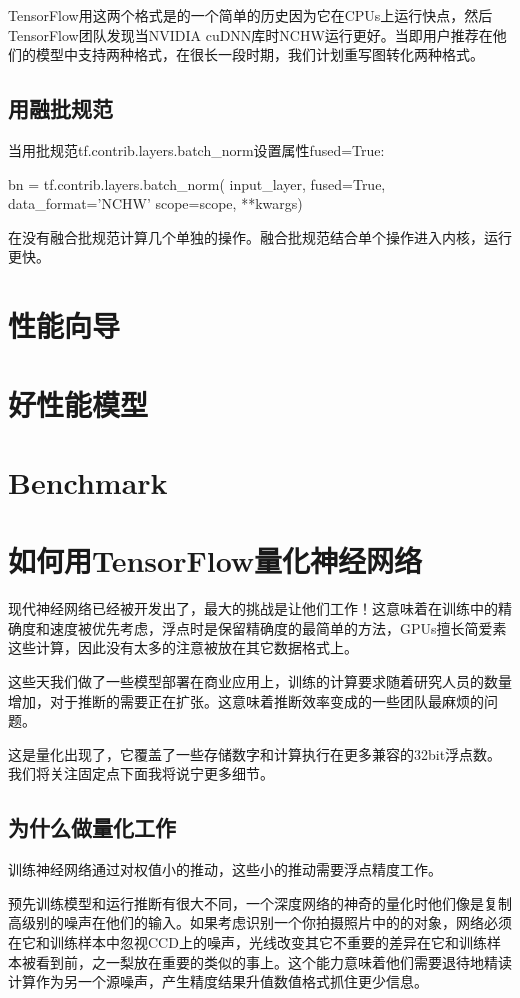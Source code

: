 TensorFlow用这两个格式是的一个简单的历史因为它在CPUs上运行快点，然后TensorFlow团队发现当NVIDIA cuDNN库时NCHW运行更好。当即用户推荐在他们的模型中支持两种格式，在很长一段时期，我们计划重写图转化两种格式。
\subsection{用融批规范}
当用批规范tf.contrib.layers.batch\_norm设置属性fused=True:
\begin{python}
bn = tf.contrib.layers.batch_norm(
          input_layer, fused=True, data_format='NCHW'
          scope=scope, **kwargs)
\end{python}
在没有融合批规范计算几个单独的操作。融合批规范结合单个操作进入内核，运行更快。
\section{性能向导}
\section{好性能模型}
\section{Benchmark}

\section{如何用TensorFlow量化神经网络}
现代神经网络已经被开发出了，最大的挑战是让他们工作！这意味着在训练中的精确度和速度被优先考虑，浮点时是保留精确度的最简单的方法，GPUs擅长简爱素这些计算，因此没有太多的注意被放在其它数据格式上。

这些天我们做了一些模型部署在商业应用上，训练的计算要求随着研究人员的数量增加，对于推断的需要正在扩张。这意味着推断效率变成的一些团队最麻烦的问题。

这是量化出现了，它覆盖了一些存储数字和计算执行在更多兼容的32bit浮点数。我们将关注固定点下面我将说宁更多细节。
\subsection{为什么做量化工作}
训练神经网络通过对权值小的推动，这些小的推动需要浮点精度工作。

预先训练模型和运行推断有很大不同，一个深度网络的神奇的量化时他们像是复制高级别的噪声在他们的输入。如果考虑识别一个你拍摄照片中的的对象，网络必须在它和训练样本中忽视CCD上的噪声，光线改变其它不重要的差异在它和训练样本被看到前，之一梨放在重要的类似的事上。这个能力意味着他们需要退待地精读计算作为另一个源噪声，产生精度结果升值数值格式抓住更少信息。
